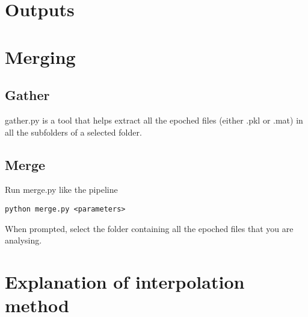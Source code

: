 \documentclass{article}
\begin{document}
\section{Outputs}

\section{Merging}
\subsection{Gather}
gather.py is a tool that helps extract all the epoched files (either .pkl or .mat) in all the subfolders of a selected folder.

\subsection{Merge}
Run merge.py like the pipeline \begin{lstlisting}
python merge.py <parameters>
\end{lstlisting}

When prompted, select the folder containing all the epoched files that you are analysing. 




\section{Explanation of interpolation method}
\end{document}
